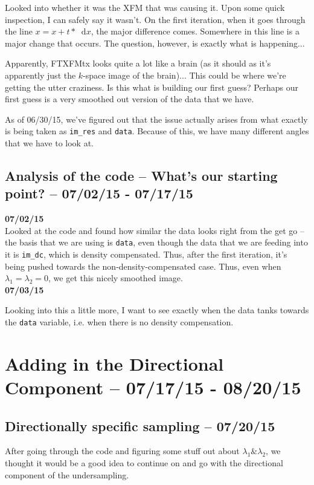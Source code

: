 \documentclass[11 pt]{article}
\newcommand*\diff{\mathop{}\!\mathrm{d}}
\newcommand{\bo}{\noindent\textbf}
\let\oldsection\section
\renewcommand\section{\clearpage\newpage\oldsection}
\begin{document}
    Looked into whether it was the XFM that was causing it. Upon some quick inspection, I can safely say it wasn't. On the first iteration, when it goes through the line $x = x + t*\diff x$, the major difference comes. Somewhere in this line is a major change that occurs. The question, however, is exactly what is happening... 

    Apparently, FTXFMtx looks quite a lot like a brain (as it should as it's apparently just the $k$-space image of the brain)... This could be where we're getting the utter craziness. Is this what is building our first guess? Perhaps our first guess is a very smoothed out version of the data that we have. 

    As of 06/30/15, we've figured out that the issue actually arises from what exactly is being taken as \texttt{im\_res} and \texttt{data}. Because of this, we have many different angles that we have to look at.


  \subsection{Analysis of the code -- What's our starting point? -- 07/02/15 - 07/17/15 }

    \bo{07/02/15}\\

    Looked at the code and found how similar the data looks right from the get go -- the basis that we are using is \texttt{data}, even though the data that we are feeding into it is \texttt{im\_dc}, which is density compensated. Thus, after the first iteration, it's being pushed towards the non-density-compensated case. Thus, even when $\lambda_1 = \lambda_2 = 0$, we get this nicely smoothed image. \\

    \bo{07/03/15}
    
    Looking into this a little more, I want to see exactly when the data tanks towards the \texttt{data} variable, i.e. when there is no density compensation. 
  

\section{Adding in the Directional Component -- 07/17/15 - 08/20/15}
  
  \subsection{Directionally specific sampling -- 07/20/15}
    After going through the code and figuring some stuff out about $\lambda_1 \& \lambda_2$, we thought it would be a good idea to continue on and go with the directional component of the undersampling.
\end{document}
